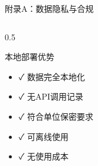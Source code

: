 \documentclass[aspectratio=169,11pt]{beamer}
\begin{document}
\begin{frame}{附录A：数据隐私与合规}
    \begin{columns}
        \begin{column}{0.5\textwidth}
            \begin{alertblock}{本地部署优势}
                \begin{itemize}
                    \item \textcolor{green!60!black}{\faCheck} 数据完全本地化
                    \item \textcolor{green!60!black}{\faCheck} 无API调用记录
                    \item \textcolor{green!60!black}{\faCheck} 符合单位保密要求
                    \item \textcolor{green!60!black}{\faCheck} 可离线使用
                    \item \textcolor{green!60!black}{\faCheck} 无使用成本
                \end{itemize}
            \end{alertblock}
            

\end{column}
\end{columns}
\end{frame}
\end{document}
